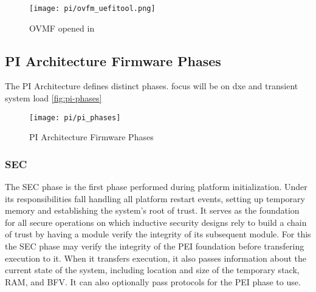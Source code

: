 \begin{figure}[htb]%
    \centering%
    \texttt{[image: pi/ovfm\_uefitool.png]}%
    \caption{\ac{OVMF} opened in }%
    \label{fig:ovmf-in-uefitool}%
\end{figure}


\subsection{\acs{PI} Architecture Firmware Phases}

The \ac{PI} Architecture defines distinct phases.
focus will be on dxe and transient system load
\autoref{fig:pi-phases}



\begin{figure}[htb]%
    \centering%
    \texttt{[image: pi/pi\_phases]}%
    \caption{\ac{PI} Architecture Firmware Phases \cite[Figure 2-1]{pi-spec}}%
    \label{fig:pi-phases}%
\end{figure}


\subsubsection{\acf{SEC}}



The \ac{SEC} phase is the first phase performed during platform initialization. Under its responsibilities fall handling all platform restart events, setting up temporary memory and establishing the system's root of trust. It serves as the foundation for all secure operations on which inductive security designs rely to build a chain of trust by having a module verify the integrity of its subsequent module. For this the \ac{SEC} phase may verify the integrity of the \ac{PEI} foundation before transfering execution to it. When it transfers execution, it also passes information about the current state of the system, including location and size of the temporary stack, \ac{RAM}, and \ac{BFV}. It can also optionally pass protocols for the \ac{PEI} phase to use.

